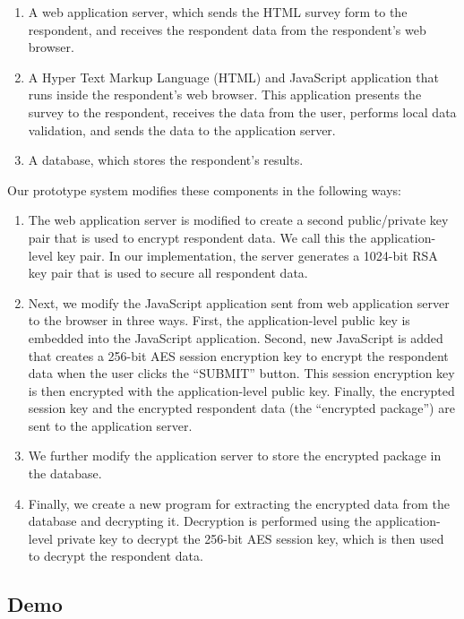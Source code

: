 \documentclass[fleqn,10pt]{wlscirep}
\begin{document}
\begin{enumerate}
  \item A web application server, which sends the HTML survey form to
    the respondent, and receives the respondent data from the
    respondent's web browser.
  \item A Hyper Text Markup Language (HTML) and JavaScript application
    that runs inside the respondent's web browser. This application
    presents the survey to the respondent, receives the data from the user, performs
    local data validation, and sends the data to the application
    server.
  \item A database, which stores the respondent's results. 
\end{enumerate}

Our prototype system modifies these components in the following ways:

\begin{enumerate}
\item The web application server is modified to create a second
  public/private key pair that is used to encrypt respondent data. We
  call this the application-level key pair. In our implementation, the
  server generates a 1024-bit RSA key pair that is used to secure all
  respondent data.
\item Next, we modify the JavaScript application sent from web
  application server to the browser in three ways. First, the
  application-level public key is embedded into the JavaScript
  application. Second, new JavaScript is added that creates a 256-bit
  AES session encryption key to encrypt the respondent data when the user clicks the
  ``SUBMIT'' button. This session encryption key is then encrypted
  with the application-level public key. Finally, the encrypted
  session key and the encrypted respondent data (the ``encrypted
  package'') are sent to the
  application server.
\item We further modify the application server to store the encrypted
  package in the database.
\item Finally, we create a new program for extracting the encrypted
  data from the database and decrypting it. Decryption is performed
  using the application-level private key to decrypt the 256-bit AES
  session key, which is then used to decrypt the respondent data.
\end{enumerate}


\subsection{Demo}
\end{document}
